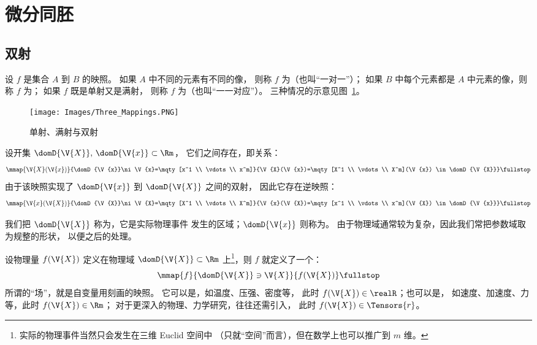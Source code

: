 \section{微分同胚}
\subsection{双射}
设 $f$ 是集合 $A$ 到 $B$ 的映照。
如果 $A$ 中不同的元素有不同的像，
则称 $f$ 为（也叫“一对一”）；
如果 $B$ 中每个元素都是 $A$ 中元素的像，则称 $f$ 为；
如果 $f$ 既是单射又是满射，
则称 $f$ 为（也叫“一一对应”）。
三种情况的示意见图~\ref{fig:单射满射双射}。

\begin{figure}[h]
	\centering
	\texttt{[image: Images/Three\_Mappings.PNG]}
	\caption{单射、满射与双射}
	\label{fig:单射满射双射}
\end{figure}

设开集 $\domD{\V{X}},\,\domD{\V{x}}\subset\Rm$，
它们之间存在，即关系：
\begin{equation}
	\mmap{\V{X}(\V{x})}
		{\domD{\V{x}}\ni\V{x}=\mqty[x^1 \\ \vdots \\ x^m]}
		{\V{X}(\V{x})=\mqty[X^1 \\ \vdots \\ X^m](\V{x})
			\in\domD{\V{X}}} \fullstop
\end{equation}
由于该映照实现了 $\domD{\V{x}}$ 到 $\domD{\V{X}}$ 之间的双射，
因此它存在逆映照：
\begin{equation}
	\mmap{\V{x}(\V{X})}
		{\domD{\V{X}}\ni\V{X}=\mqty[X^1 \\ \vdots \\ X^m]}
		{\V{x}(\V{X})=\mqty[x^1 \\ \vdots \\ x^m](\V{X})
			\in\domD{\V{x}}} \fullstop
\end{equation}

我们把 $\domD{\V{X}}$ 称为，它是实际物理事件
发生的区域；$\domD{\V{x}}$ 则称为。
由于物理域通常较为复杂，因此我们常把参数域取为规整的形状，
以便之后的处理。

设物理量 $f(\V{X})$ 定义在物理域
$\domD{\V{X}}\subset\Rm$ 上\footnote{
	实际的物理事件当然只会发生在三维 Euclid 空间中
	（只就“空间”而言），但在数学上也可以推广到 $m$ 维。
}，则 $f$ 就定义了一个：
\begin{equation}
	\mmap{f}
		{\domD{\V{X}}\ni\V{X}}
		{f(\V{X})} \fullstop
\end{equation}
所谓的“场”，就是自变量用刻画的映照。
它可以是，如温度、压强、密度等，
此时 $f(\V{X})\in\realR$；也可以是，
如速度、加速度、力等，此时 $f(\V{X})\in\Rm$；
对于更深入的物理、力学研究，往往还需引入，
此时 $f(\V{X})\in\Tensors{r}$。

